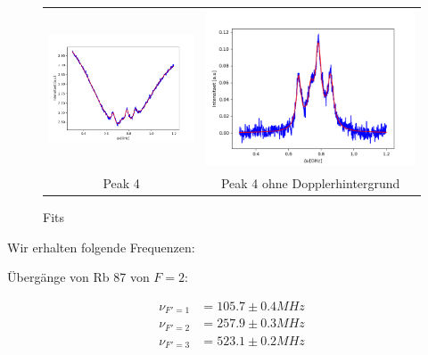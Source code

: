 \documentclass[a4paper,parskip]{scrartcl}
\begin{document}
\begin{figure}[p]
\begin{tabular}{cc}
    \includegraphics[scale = 0.45]{./saturation/peak4/fit.png}  &  \includegraphics[scale = 0.45]{./saturation/peak4/gaussCorrected.png}  \\
    {\footnotesize Peak 4} &  {\footnotesize Peak 4 ohne Dopplerhintergrund}  \\
\end{tabular}
\caption{Fits}
\label{fig:Abbildung1}
\end{figure}

Wir erhalten folgende Frequenzen:

Übergänge von Rb 87 von $F=2$:

\begin{align*}
\nu_{F'=1} &= 105.7 \pm 0.4 MHz \\
\nu_{F'=2} &= 257.9 \pm 0.3 MHz \\
\nu_{F'=3} &= 523.1 \pm 0.2 MHz  
\end{align*}
\end{document}
